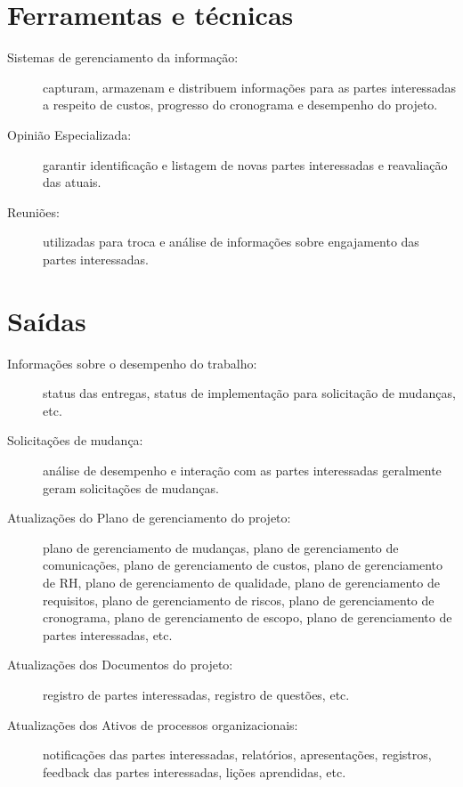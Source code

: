 \section{Ferramentas e técnicas}

\begin{description}

	\item[Sistemas de gerenciamento da informação:] capturam, armazenam e distribuem informações para as partes interessadas a respeito de custos, progresso do cronograma e desempenho do projeto.
	
	\item[Opinião Especializada:] garantir identificação e listagem de novas partes interessadas e reavaliação das atuais.
	
	\item[Reuniões:] utilizadas para troca e análise de informações sobre engajamento das partes interessadas.
			
\end{description}

\section{Saídas}

\begin{description}
	
	\item[Informações sobre o desempenho do trabalho:] status das entregas, status de implementação para solicitação de mudanças, etc.
	
	\item[Solicitações de mudança:] análise de desempenho e interação com as partes interessadas geralmente geram solicitações de mudanças.
	
	\item[Atualizações do Plano de gerenciamento do projeto:] plano de gerenciamento de mudanças, plano de gerenciamento de comunicações, plano de gerenciamento de custos, plano de gerenciamento de RH, plano de gerenciamento de qualidade, plano de gerenciamento de requisitos, plano de gerenciamento de riscos, plano de gerenciamento de cronograma, plano de gerenciamento de escopo, plano de gerenciamento de partes interessadas, etc.
	
	\item[Atualizações dos Documentos do projeto:] registro de partes interessadas, registro de questões, etc.
	
	\item[Atualizações dos Ativos de processos organizacionais:] notificações das partes interessadas, relatórios, apresentações, registros, feedback das partes interessadas, lições aprendidas, etc.
	
\end{description}